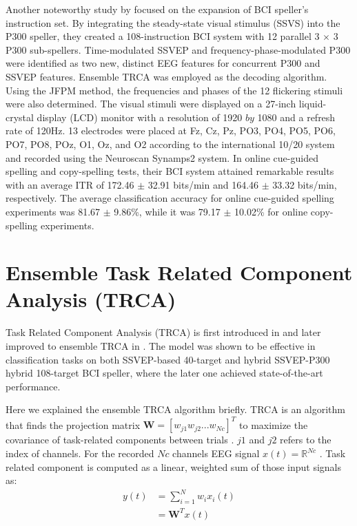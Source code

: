 Another noteworthy study by \cite{xu2020implementing} focused on the expansion of BCI speller's instruction set. By integrating the steady-state visual stimulus (SSVS) into the P300 speller, they created a 108-instruction BCI system with 12 parallel 3 $\times$ 3 P300 sub-spellers. Time-modulated SSVEP and frequency-phase-modulated P300 were identified as two new, distinct EEG features for concurrent P300 and SSVEP features. Ensemble TRCA was employed as the decoding algorithm. Using the JFPM method, the frequencies and phases of the 12 flickering stimuli were also determined. The visual stimuli were displayed on a 27-inch liquid-crystal display (LCD) monitor with a resolution of 1920 $by$ 1080 and a refresh rate of 120Hz. 13 electrodes were placed at Fz, Cz, Pz, PO3, PO4, PO5, PO6, PO7, PO8, POz, O1, Oz, and O2 according to the international 10/20 system and recorded using the Neuroscan Synamps2 system. In online cue-guided spelling and copy-spelling tests, their BCI system attained remarkable results with an average ITR of 172.46 $\pm$ 32.91 bits/min and 164.46 $\pm$ 33.32 bits/min, respectively. The average classification accuracy for online cue-guided spelling experiments was 81.67 $\pm$ 9.86\%, while it was 79.17 $\pm$ 10.02\% for online copy-spelling experiments.


\section{Ensemble Task Related Component Analysis (TRCA)}

Task Related Component Analysis (TRCA) is first introduced in \cite{nakanishi2017enhancing} and later improved to ensemble TRCA in \cite{xu2020implementing}.
The model was shown to be effective in classification tasks on both SSVEP-based 40-target \citep{nakanishi2017enhancing} and hybrid SSVEP-P300 hybrid 108-target \citep{xu2020implementing} BCI speller, where the later one achieved state-of-the-art performance.
 

Here we explained the ensemble TRCA algorithm briefly.  TRCA is an algorithm that finds the projection matrix $\mathbf{W} = [w_{j1} w_{j2} ... w_{Nc}]^T$ to maximize the covariance of task-related components between trials \cite{tanaka2013task}. $j1$ and $j2$ refers to the index of channels. For the recorded $Nc$ channels EEG signal $x(t) = \mathbb{R}^{Nc}$ . Task related component is computed as a linear, weighted sum of those input signals as:
\begin{equation}\label{eq1}
\begin{split}
    y(t) & = \sum_{i=1}^{N}w_{i}x_{i}(t) \\
         & = \mathbf{W}^{T}x(t)
\end{split}
\end{equation}

